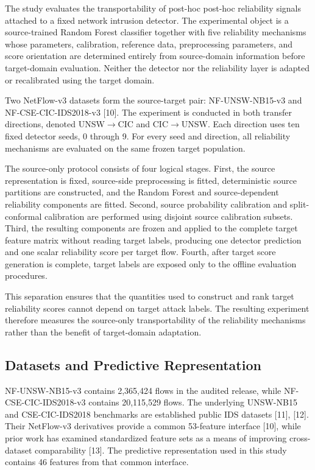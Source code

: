 \documentclass[conference]{IEEEtran}
\begin{document}
The study evaluates the transportability of post-hoc post-hoc reliability signals attached to a fixed network intrusion detector. The experimental object is a source-trained Random Forest classifier together with five reliability mechanisms whose parameters, calibration, reference data, preprocessing parameters, and score orientation are determined entirely from source-domain information before target-domain evaluation. Neither the detector nor the reliability layer is adapted or recalibrated using the target domain.

Two NetFlow-v3 datasets form the source-target pair: NF-UNSW-NB15-v3 and NF-CSE-CIC-IDS2018-v3 [10]. The experiment is conducted in both transfer directions, denoted UNSW$\rightarrow$CIC and CIC$\rightarrow$UNSW. Each direction uses ten fixed detector seeds, 0 through 9. For every seed and direction, all reliability mechanisms are evaluated on the same frozen target population.

The source-only protocol consists of four logical stages. First, the source representation is fixed, source-side preprocessing is fitted, deterministic source partitions are constructed, and the Random Forest and source-dependent reliability components are fitted. Second, source probability calibration and split-conformal calibration are performed using disjoint source calibration subsets. Third, the resulting components are frozen and applied to the complete target feature matrix without reading target labels, producing one detector prediction and one scalar reliability score per target flow. Fourth, after target score generation is complete, target labels are exposed only to the offline evaluation procedures.

This separation ensures that the quantities used to construct and rank target reliability scores cannot depend on target attack labels. The resulting experiment therefore measures the source-only transportability of the reliability mechanisms rather than the benefit of target-domain adaptation.

\subsection{Datasets and Predictive Representation}

NF-UNSW-NB15-v3 contains 2,365,424 flows in the audited release, while NF-CSE-CIC-IDS2018-v3 contains 20,115,529 flows. The underlying UNSW-NB15 and CSE-CIC-IDS2018 benchmarks are established public IDS datasets [11], [12]. Their NetFlow-v3 derivatives provide a common 53-feature interface [10], while prior work has examined standardized feature sets as a means of improving cross-dataset comparability [13]. The predictive representation used in this study contains 46 features from that common interface.
\end{document}
